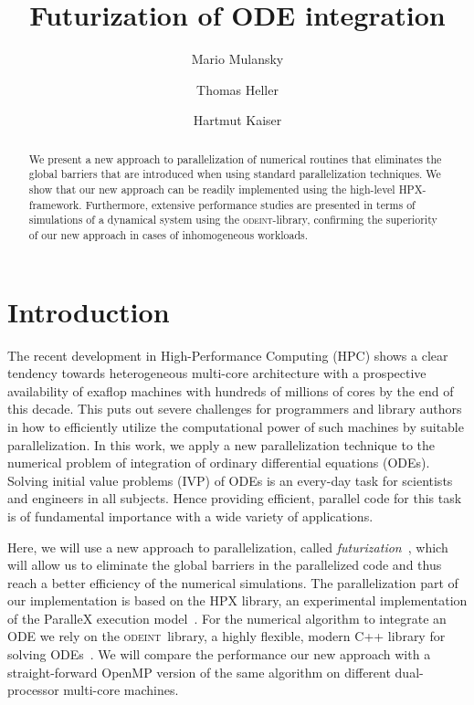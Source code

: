 \documentclass[10pt]{elsarticle}
\title{Futurization of ODE integration}
\author[cct]{Mario Mulansky}
\author[fau]{Thomas Heller}
\author[cct]{Hartmut Kaiser}
\newcommand{\odeint}{\textsc{odeint}}
\begin{document}
\begin{abstract}
We present a new approach to parallelization of numerical routines that eliminates the global barriers that are introduced when using standard parallelization techniques.
We show that our new approach can be readily implemented using the high-level HPX-framework.
Furthermore, extensive performance studies are presented in terms of simulations of a dynamical system using the \odeint-library, confirming the superiority of our new approach in cases of inhomogeneous workloads.
\end{abstract}

\maketitle

\section{Introduction}

The recent development in High-Performance Computing (HPC) shows a clear tendency towards heterogeneous multi-core architecture with a prospective availability of exaflop machines with hundreds of millions of cores by the end of this decade.
This puts out severe challenges for programmers and library authors in how to efficiently utilize the computational power of such machines by suitable parallelization.
In this work, we apply a new parallelization technique to the numerical problem of integration of ordinary differential equations (ODEs).
Solving initial value problems (IVP) of ODEs is an every-day task for scientists and engineers in all subjects.
Hence providing efficient, parallel code for this task is of fundamental importance  with a wide variety of applications.

Here, we will use a new approach to parallelization, called \emph{futurization}~\cite{Heller_Kaiser_Mulansky_tbp}, which will allow us to eliminate the global barriers in the parallelized code and thus reach a better efficiency of the numerical simulations.
The parallelization part of our implementation is based on the HPX library, an experimental implementation of the ParalleX execution model~\cite{Kaiser_Brodowicz_Sterling_09}.
For the numerical algorithm to integrate an ODE we rely on the \odeint\ library, a highly flexible, modern C++ library for solving ODEs~\cite{Ahnert_Mulansky_11}.
We will compare the performance our new approach with a straight-forward OpenMP version of the same algorithm on different dual-processor multi-core machines.
\end{document}
